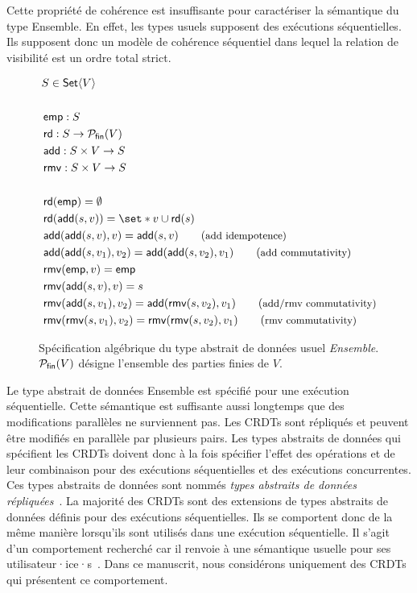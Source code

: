 Cette propriété de cohérence est insuffisante pour caractériser la sémantique du type Ensemble.
En effet, les types usuels supposent des exécutions séquentielles.
Ils supposent donc un modèle de cohérence séquentiel dans lequel la relation de visibilité est un ordre total strict.

\begin{figure}[tb]
    \centering
    \begin{align*}
    &S \in \trm{Set}\tuple*{V}\\
    &\\
    &\trm{emp}: S\\
    &\trm{rd}: S \to \powerfset{V}\\
    &\trm{add}: S \times V \to S\\
    &\trm{rmv}: S \times V \to S\\
    &\\
    &\trm{rd}(\trm{emp}) = \emptyset \\
    &\trm{rd}(\trm{add}(s, v)) = \set*{v} \cup \trm{rd}(s) \\
    &\trm{add}(\trm{add}(s, v), v) = \trm{add}(s, v) \tag{\small add idempotence}\\
    &\trm{add}(\trm{add}(s, v_1), v_2) = \trm{add}(\trm{add}(s, v_2), v_1) \tag{\small add commutativity}\\
    &\trm{rmv}(\trm{emp}, v) = \trm{emp}\\
    &\trm{rmv}(\trm{add}(s, v), v) = s\\
    &\trm{rmv}(\trm{add}(s, v_1), v_2) = \trm{add}(\trm{rmv}(s, v_2), v_1) \tag{\small add/rmv commutativity}\\
    &\trm{rmv}(\trm{rmv}(s, v_1), v_2) = \trm{rmv}(\trm{rmv}(s, v_2), v_1) \tag{\small rmv commutativity}\\
    \end{align*}
    \caption[Spécification algébrique du type abstrait \emph{Ensemble}]{Spécification algébrique du type abstrait de données usuel \emph{Ensemble}.
    $\mathcal{P}_{\mathsf{fin}} (V)$ désigne l'ensemble des parties finies de $V$.}\label{fig:set-spec}
\end{figure}

Le type abstrait de données Ensemble est spécifié pour une exécution séquentielle.
Cette sémantique est suffisante aussi longtemps que des modifications parallèles ne surviennent pas.
Les \acp{CRDT} sont répliqués et peuvent être modifiés en parallèle par plusieurs pairs.
Les types abstraits de données qui spécifient les \acp{CRDT} doivent donc à la fois spécifier l'effet des opérations et de leur combinaison pour des exécutions séquentielles et des exécutions concurrentes.
Ces types abstraits de données sont nommés \emph{types abstraits de données répliquées}~\autocite{roh_2011_rga}.
La majorité des \acp{CRDT} sont des extensions de types abstraits de données définis pour des exécutions séquentielles.
Ils se comportent donc de la même manière lorsqu'ils sont utilisés dans une exécution séquentielle.
Il s'agit d'un comportement recherché car il renvoie à une sémantique usuelle pour ses utilisateur·ice·s~\autocite{preguia2018_crdt}.
Dans ce manuscrit, nous considérons uniquement des \acp{CRDT} qui présentent ce comportement.

